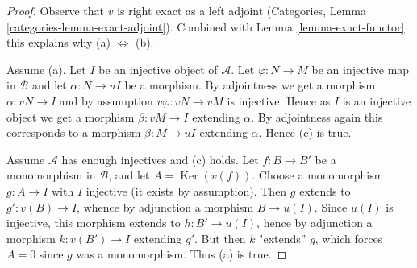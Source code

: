 \documentclass[10pt,a4paper]{amsart}
\theoremstyle{plain}
\theoremstyle{definition}
\theoremstyle{remark}
\numberwithin{equation}{subsection}
\def\Ker{\mathop{\mathrm{Ker}}}
\begin{document}
\begin{proof}
Observe that $v$ is right exact as a left adjoint (Categories, Lemma
\ref{categories-lemma-exact-adjoint}). Combined with
Lemma \ref{lemma-exact-functor} this explains why (a) $\Leftrightarrow$ (b).

\medskip\noindent
Assume (a). Let $I$ be an injective object of $\mathcal{A}$.
Let $\varphi : N \to M$ be an injective map in $\mathcal{B}$ and let
$\alpha : N \to uI$ be a morphism.
By adjointness we get a morphism $\alpha : vN \to I$ and
by assumption $v\varphi : vN \to vM$ is injective.
Hence as $I$ is an injective object we get a morphism
$\beta : vM \to I$ extending $\alpha$. By adjointness
again this corresponds to a morphism $\beta : M \to uI$ extending $\alpha$.
Hence (c) is true.

\medskip\noindent
Assume $\mathcal{A}$ has enough injectives and (c) holds.
Let  $f : B \to B'$ be a monomorphism in $\mathcal{B}$, and let
$A = \Ker(v(f))$. Choose a monomorphism $g : A \to I$ with $I$ injective
(it exists by assumption). Then $g$ extends to $g' : v(B) \to I$,
whence by adjunction a morphism $B \to u(I)$. Since $u(I)$ is injective,
this morphism extends to $h : B' \to u(I)$, hence by adjunction a morphism
$k : v(B') \to I$ extending $g'$. But then $k$ "extends'' $g$,
which forces $A = 0$ since $g$ was a monomorphism. Thus (a) is true.
\end{proof}
\end{document}
